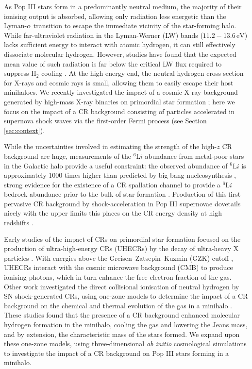 \documentclass{thesis}
\newcommand{\ev}{\ensuremath{\,\mathrm{eV}}\xspace}
\newcommand{\htwo}{\ensuremath{\mathrm{H}_2}\xspace}
\begin{document}
As Pop III stars form in a predominantly neutral medium, the majority of their ionising output is absorbed, allowing only radiation less energetic than the Lyman-$\alpha$ transition to escape the immediate vicinity of the star-forming halo.  
While far-ultraviolet radiation in the Lyman-Werner (LW) bands ($11.2 - 13.6\ev$) lacks sufficient energy to interact with atomic hydrogen, it can still effectively dissociate molecular hydrogen.  
However, studies have found that the expected mean value of such radiation is far below the critical LW flux required to suppress $\htwo$ cooling \mbox{\citep{Dijkstraetal2008}}. 
At the high energy end, the neutral hydrogen cross section for X-rays and cosmic rays is small, allowing them to easily escape their host minihaloes. 
We recently investigated the impact of a cosmic X-ray background generated by high-mass X-ray binaries on primordial star formation \citep{Hummeletal2015}; here we focus on the impact of a CR background consisting of particles accelerated in supernova shock waves via the first-order Fermi process (see Section \ref{sec:context}).  

While the uncertainties involved in estimating the strength of the high-$z$  CR background are huge,  measurements of the $^6{\mathrm Li}$ abundance from metal-poor stars in the Galactic halo provide a useful constraint: the observed abundance of  $^6{\mathrm Li}$ is approximately 1000 times higher than predicted by big bang nucleosynthesis \citep{Asplundetal2006}, strong evidence for the existence of a CR spallation channel to provide a $^6{\mathrm Li}$ bedrock abundance prior to the bulk of star formation \citep{RollindeVangioniOlive2005,RollindeVangioniOlive2006}. 
Production of this first pervasive CR background by shock-acceleration in Pop III supernovae dovetails nicely with the upper limits this places on the CR energy density at high redshifts \citep{RollindeVangioniOlive2006}.

Early studies of the impact of CRs on primordial star formation focused on the production of ultra-high-energy CRs (UHECRs) by the decay of ultra-heavy X particles \citep{ShchekinovVasiliev2004,VasilievShchekinov2006,RipamontiMapelliFerrara2007}.  
With energies above the Greisen--Zatsepin--Kuzmin (GZK) cutoff \citep{Greisen1966,ZatsepinKuzmin1966}, UHECRs interact with the cosmic microwave background (CMB) to produce ionising photons, which in turn enhance the free electron fraction of the gas.  
Other work investigated the direct collisional ionisation of neutral hydrogen by SN shock-generated CRs, using one-zone models to determine the impact of a CR background on the chemical and thermal evolution of the gas in a minihalo \citep{StacyBromm2007,JascheCiardiEnsslin2007}.  
These studies found that the presence of a CR background enhanced molecular hydrogen formation in the minihalo, cooling the gas and lowering the Jeans mass, and by extension, the characteristic mass of the stars formed. 
We expand upon these one-zone models, using three-dimensional \textit{ab initio} cosmological simulations to investigate the impact of a CR background on Pop III stars forming in a minihalo.
\end{document}
